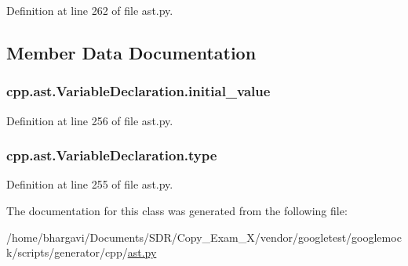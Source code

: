 Definition at line 262 of file ast.\+py.



\subsection{Member Data Documentation}
\subsubsection[{\texorpdfstring{initial\+\_\+value}{initial_value}}]{\setlength{\rightskip}{0pt plus 5cm}cpp.\+ast.\+Variable\+Declaration.\+initial\+\_\+value}\hypertarget{classcpp_1_1ast_1_1_variable_declaration_a7c259ca42a06e264679e8ab66e7ea374}{}\label{classcpp_1_1ast_1_1_variable_declaration_a7c259ca42a06e264679e8ab66e7ea374}


Definition at line 256 of file ast.\+py.

\subsubsection[{\texorpdfstring{type}{type}}]{\setlength{\rightskip}{0pt plus 5cm}cpp.\+ast.\+Variable\+Declaration.\+type}\hypertarget{classcpp_1_1ast_1_1_variable_declaration_a8c7cc8578ea12f93c6e1c5c6ef4ddf99}{}\label{classcpp_1_1ast_1_1_variable_declaration_a8c7cc8578ea12f93c6e1c5c6ef4ddf99}


Definition at line 255 of file ast.\+py.



The documentation for this class was generated from the following file\+:\begin{DoxyCompactItemize}
\item 
/home/bhargavi/\+Documents/\+S\+D\+R/\+Copy\+\_\+\+Exam\+\_\+X/vendor/googletest/googlemock/scripts/generator/cpp/\hyperlink{ast_8py}{ast.\+py}\end{DoxyCompactItemize}
